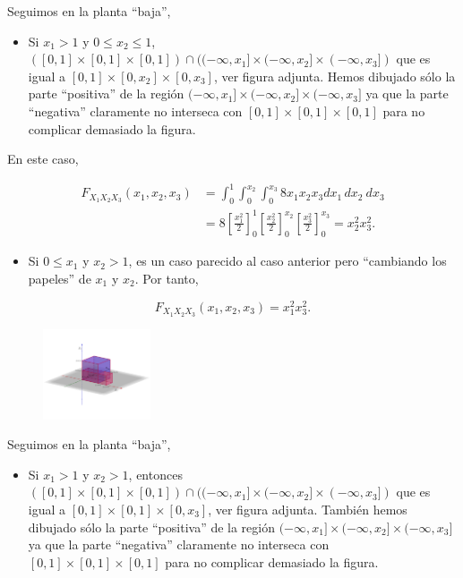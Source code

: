 \documentclass[
  letterpaper,
  DIV=11,
  numbers=noendperiod]{scrreprt}
\providecommand{\tightlist}{%
  \setlength{\itemsep}{0pt}\setlength{\parskip}{0pt}}\usepackage{longtable,booktabs,array}
\begin{document}
Seguimos en la planta ``baja'',

\begin{itemize}
\tightlist
\item
  Si \(x_1 >1\) y \(0\leq x_2\leq 1\),
  \(([0,1]\times [0,1]\times [0,1])\cap ((-\infty,x_1]\times (-\infty,x_2]\times (-\infty,x_3])\)
  que es igual a \([0,1]\times [0,x_2]\times [0,x_3]\), ver figura
  adjunta. Hemos dibujado sólo la parte ``positiva'' de la región
  \((-\infty,x_1]\times (-\infty,x_2]\times (-\infty,x_3]\) ya que la
  parte ``negativa'' claramente no interseca con
  \([0,1]\times [0,1]\times [0,1]\) para no complicar demasiado la
  figura.
\end{itemize}

En este caso,

\[
\begin{array}{rl}
F_{X_1X_2X_3}(x_1,x_2,x_3) & =\int_{0}^{1}\int_{0}^{x_2}\int_{0}^{x_3} 8 x_1 x_2 x_3 dx_1\, dx_2\ dx_3 \\
& = 
8\left[\frac{x_1^2}{2}\right]_0^{1}\left[\frac{x_2^2}{2}\right]_0^{x_2}\left[\frac{x_3^2}{2}\right]_0^{x_3} = x_2^2 x_3^2.
\end{array}
\]

\begin{itemize}
\tightlist
\item
  Si \(0\leq x_1\) y \(x_2>1\), es un caso parecido al caso anterior
  pero ``cambiando los papeles'' de \(x_1\) y \(x_2\). Por tanto,
\end{itemize}

\[
F_{X_1X_2X_3}(x_1,x_2,x_3)=x_1^2 x_3^2.
\]

\begin{figure}

{\centering \includegraphics[width=1.25in,height=\textheight]{Images/Fx1x2x3bajosx1.png}

}

\end{figure}

Seguimos en la planta ``baja'',

\begin{itemize}
\tightlist
\item
  Si \(x_1>1\) y \(x_2>1\), entonces
  \(([0,1]\times [0,1]\times [0,1])\cap ((-\infty,x_1]\times (-\infty,x_2]\times (-\infty,x_3])\)
  que es igual a \([0,1]\times [0,1]\times [0,x_3]\), ver figura
  adjunta. También hemos dibujado sólo la parte ``positiva'' de la
  región \((-\infty,x_1]\times (-\infty,x_2]\times (-\infty,x_3]\) ya
  que la parte ``negativa'' claramente no interseca con
  \([0,1]\times [0,1]\times [0,1]\) para no complicar demasiado la
  figura.
\end{itemize}
\end{document}
